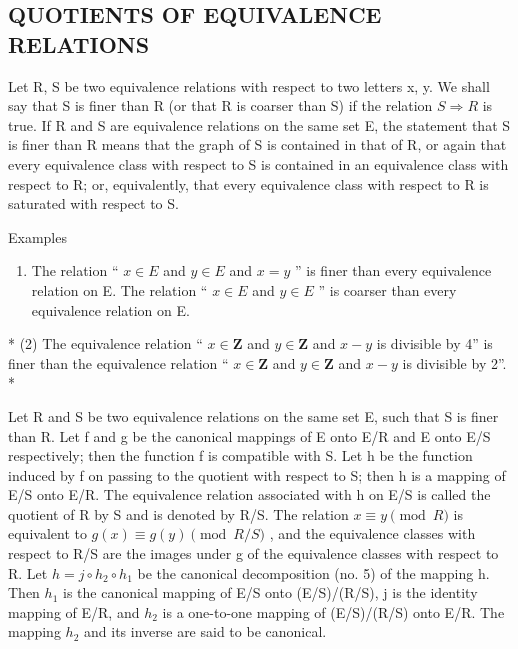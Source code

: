 \subsection{QUOTIENTS OF EQUIVALENCE RELATIONS}

Let R, S be two equivalence relations with respect to two letters x, y. We shall say that S is finer than R (or that R is coarser than S) if the relation \(S \Longrightarrow R\) is true. If R and S are equivalence relations on the same set E, the statement that S is finer than R means that the graph of S is contained in that of R, or again that every equivalence class with respect to S is contained in an equivalence class with respect to R; or, equivalently, that every equivalence class with respect to R is saturated with respect to S.

Examples

\begin{enumerate}
\def\labelenumi{(\arabic{enumi})}
\tightlist
\item
  The relation `` \(x \in E\) and \(y \in E\) and \(x = y\) '' is finer than every equivalence relation on E. The relation `` \(x \in E\) and \(y \in E\) '' is coarser than every equivalence relation on E.
\end{enumerate}

* (2) The equivalence relation `` \(x \in \mathbf{Z}\) and \(y \in \mathbf{Z}\) and \(x - y\) is divisible by 4'' is finer than the equivalence relation `` \(x \in \mathbf{Z}\) and \(y \in \mathbf{Z}\) and \(x - y\) is divisible by 2''. *

Let R and S be two equivalence relations on the same set E, such that S is finer than R. Let f and g be the canonical mappings of E onto E/R and E onto E/S respectively; then the function f is compatible with S. Let h be the function induced by f on passing to the quotient with respect to S; then h is a mapping of E/S onto E/R. The equivalence relation associated with h on E/S is called the quotient of R by S and is denoted by R/S. The relation \(x \equiv y \pmod{R}\) is equivalent to \(g(x) \equiv g(y) \pmod{R/S}\) , and the equivalence classes with respect to R/S are the images under g of the equivalence classes with respect to R. Let \(h = j \circ h_{2} \circ h_{1}\) be the canonical decomposition (no. 5) of the mapping h. Then \(h_{1}\) is the canonical mapping of E/S onto (E/S)/(R/S), j is the identity mapping of E/R, and \(h_{2}\) is a one-to-one mapping of (E/S)/(R/S) onto E/R. The mapping \(h_{2}\) and its inverse are said to be canonical.

